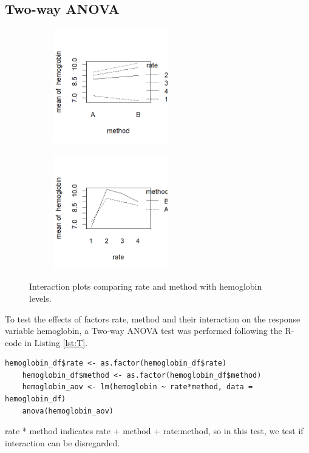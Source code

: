 \documentclass{article}
\begin{document}
\subsection{Two-way ANOVA}

\begin{figure}[h]
    \centering
    \begin{subfigure}{.45\textwidth}
        \centering
        \includegraphics[height=5cm]{int_meth.png}
        \label{fig:int_rate}
    \end{subfigure}
    \begin{subfigure}{.45\textwidth}
        \centering
        \includegraphics[height=5cm]{int_r.png}
        \label{fig:int_method}
    \end{subfigure}
    \caption{Interaction plots comparing rate and method with hemoglobin levels. }
\end{figure}

To test the effects of factors rate, method and their interaction on the response variable hemoglobin, a Two-way ANOVA test was performed following the R-code in Listing \ref{lst:T}. 
\begin{lstlisting}[caption="Two-way ANOVA", label={lst:T}]
    hemoglobin_df$rate <- as.factor(hemoglobin_df$rate) 
    hemoglobin_df$method <- as.factor(hemoglobin_df$method)
    hemoglobin_aov <- lm(hemoglobin ~ rate*method, data = hemoglobin_df)
    anova(hemoglobin_aov)   
\end{lstlisting}
rate * method indicates rate + method + rate:method, so in this test, we test if interaction can be disregarded. 
\end{document}
